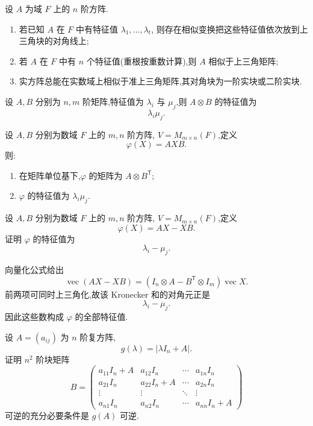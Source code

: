 \begin{theorem}[\markstar]
设 $A$ 为域 $F$ 上的 $n$ 阶方阵.
\begin{enumerate}
    \item 若已知 $A$ 在 $F$ 中有特征值 $\lambda_1,\ldots,\lambda_t$,
    则存在相似变换把这些特征值依次放到上三角块的对角线上;
    \item 若 $A$ 在 $F$ 中有 $n$ 个特征值(重根按重数计算),则 $A$ 相似于上三角矩阵;
    \item 实方阵总能在实数域上相似于准上三角矩阵,其对角块为一阶实块或二阶实块.
\end{enumerate}
\end{theorem}


\begin{proposition}[\markstar]
设 $A,B$ 分别为 $n,m$ 阶矩阵,特征值为
$\lambda_i$ 与 $\mu_j$,则 $A\otimes B$ 的特征值为
\[
\lambda_i\mu_j.
\]
\end{proposition}


\begin{proposition}[\marktwostar]
设 $A,B$ 分别为数域 $F$ 上的 $m,n$ 阶方阵,
$V=M_{m\times n}(F)$,定义
\[
\varphi(X)=AXB.
\]
则:
\begin{enumerate}
    \item 在矩阵单位基下,$\varphi$ 的矩阵为 $A\otimes B^{\mathsf T}$;
    \item $\varphi$ 的特征值为 $\lambda_i\mu_j$.
\end{enumerate}
\end{proposition}


\begin{example}
设 $A,B$ 分别为数域 $F$ 上的 $m,n$ 阶方阵,
$V=M_{m\times n}(F)$,定义
\[
\varphi(X)=AX-XB.
\]
证明 $\varphi$ 的特征值为
\[
\lambda_i-\mu_j.
\]
\end{example}
\exampleblank

\begin{solution}
向量化公式给出
\[
\operatorname{vec}(AX-XB)
=
\left(I_n\otimes A-B^{\mathsf T}\otimes I_m\right)\operatorname{vec}X.
\]
前两项可同时上三角化,故该 Kronecker 和的对角元正是
\[
\lambda_i-\mu_j.
\]
因此这些数构成 $\varphi$ 的全部特征值.
\end{solution}


\begin{example}
设 $A=(a_{ij})$ 为 $n$ 阶复方阵,
\[
g(\lambda)=|\lambda I_n+A|.
\]
证明 $n^2$ 阶块矩阵
\[
B=
\begin{pmatrix}
a_{11}I_n+A&a_{12}I_n&\cdots&a_{1n}I_n\\
a_{21}I_n&a_{22}I_n+A&\cdots&a_{2n}I_n\\
\vdots&\vdots&\ddots&\vdots\\
a_{n1}I_n&a_{n2}I_n&\cdots&a_{nn}I_n+A
\end{pmatrix}
\]
可逆的充分必要条件是 $g(A)$ 可逆.
\end{example}
\exampleblank

